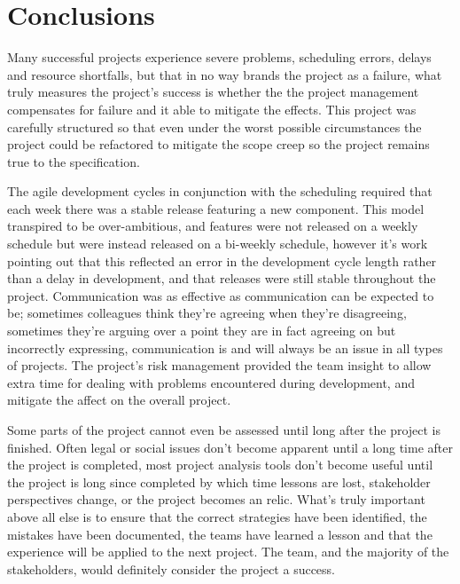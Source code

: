 \section{Conclusions}

Many successful projects experience severe problems, scheduling errors, delays and resource shortfalls, but that in no way brands the project as a failure, what truly measures the project's success is whether the the project management compensates for failure and it able to mitigate the effects. This project was carefully structured so that even under the worst possible circumstances the project could be refactored to mitigate the scope creep so the project remains true to the specification. 

The agile development cycles in conjunction with the scheduling required that each week there was a stable release featuring a new component. This model transpired to be over-ambitious, and features were not released on a weekly schedule but were instead released on a bi-weekly schedule, however it's work pointing out that this reflected an error in the development cycle length rather than a delay in development, and that releases were still stable throughout the project. Communication was as effective as communication can be expected to be; sometimes colleagues think they're agreeing when they're disagreeing, sometimes they're arguing over a point they are in fact agreeing on but incorrectly expressing, communication is and will always be an issue in all types of projects. The project's risk management provided the team insight to allow extra time for dealing with problems encountered during development, and mitigate the affect on the overall project.

Some parts of the project cannot even be assessed until long after the project is finished. Often legal or social issues don't become apparent until a long time after the project is completed, most project analysis tools don't become useful until the project is long since completed by which time lessons are lost, stakeholder perspectives change, or the project becomes an relic. What's truly important above all else is to ensure that the correct strategies have been identified, the mistakes have been documented, the teams have learned a lesson and that the experience will be applied to the next project. The team, and the majority of the stakeholders, would definitely consider the project a success.
